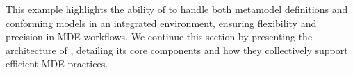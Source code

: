 This example highlights the ability of \jjodel{} to handle both metamodel definitions and conforming models in an integrated environment, ensuring flexibility and precision in MDE workflows. We continue this section by presenting the architecture of \jjodel{}, detailing its core components and how they collectively support efficient MDE practices.  







